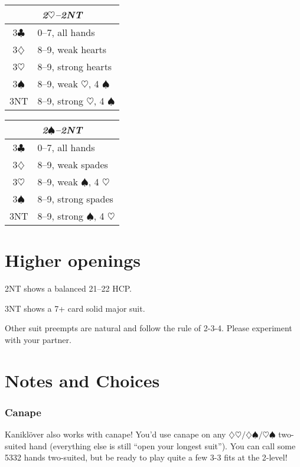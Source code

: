 \documentclass[a4paper, twoside, 11pt]{article}
\begin{document}
\begin{multicols}{3}
\begin{center}
\begin{tabular}{ |c|l| }
 \hline
 \multicolumn{2}{|c|}{\textit{2$\heartsuit$--2NT}} \\
 \hline
3$\clubsuit$ & 0--7, all hands\\
3$\diamondsuit$ & 8--9, weak hearts \\
3$\heartsuit$ & 8--9, strong hearts \\
3$\spadesuit$ & 8--9, weak $\heartsuit$, 4 $\spadesuit$ \\
 3NT & 8--9, strong $\heartsuit$, 4 $\spadesuit$ \\
 \hline
\end{tabular}
\end{center}

\begin{center}
\begin{tabular}{ |c|l| }
 \hline
 \multicolumn{2}{|c|}{\textit{2$\spadesuit$--2NT}} \\
 \hline
3$\clubsuit$ & 0--7, all hands\\
3$\diamondsuit$ & 8--9, weak spades \\
3$\heartsuit$ & 8--9, weak $\spadesuit$, 4 $\heartsuit$ \\
3$\spadesuit$ & 8--9, strong spades \\
 3NT & 8--9, strong $\spadesuit$, 4 $\heartsuit$ \\
 \hline
\end{tabular}
\end{center}


\section{Higher openings}

2NT shows a balanced 21--22 HCP.

3NT shows a 7+ card solid major suit.

Other suit preempts are natural and follow the rule of 2-3-4. Please experiment with your partner.



\section{Notes and Choices}

\subsubsection*{Canape}
 Kaniklöver also works with canape! You'd use canape on any $\diamondsuit\heartsuit/ \diamondsuit\spadesuit/ \heartsuit\spadesuit$ two-suited hand (everything else is still ``open your longest suit''). You can call some 5332 hands two-suited, but be ready to play quite a few 3-3 fits at the 2-level!




\end{multicols}
\end{document}

